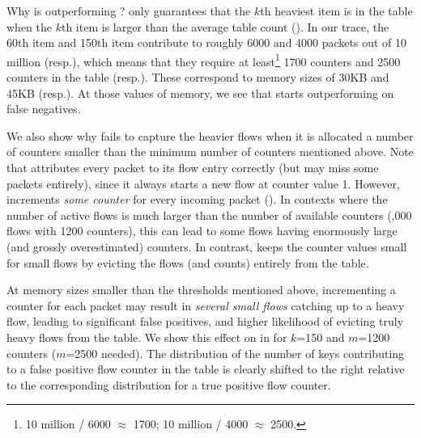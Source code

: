 Why is \TheSystem outperforming \spacesaving? \spacesaving only guarantees that
the $k$th heaviest item is in the table when the $k$th item is larger than the
average table count (). In our trace, the 60th item and
150th item contribute to roughly 6000 and 4000 packets out of 10 million
(resp.), which means that they require at least\footnote{10 million / 6000
  $\approx$ 1700; 10 million / 4000 $\approx$ 2500.} 1700 counters and 2500
counters in the table (resp.). These correspond to memory sizes of 30KB and 45KB
(resp.). At those values of memory, we see that \spacesaving starts
outperforming \TheSystem on false negatives.

We also show why \spacesaving fails to capture the heavier flows when it is
allocated a number of counters smaller than the minimum number of counters
mentioned above. Note that \TheSystem attributes every packet to its flow entry
correctly (but may miss some packets entirely), since it always starts a new
flow at counter value 1. However, \spacesaving increments {\em some counter} for
every incoming packet (). In contexts where the number of
active flows is much larger than the number of available counters (,000
flows with 1200 counters), this can lead to some flows having enormously large
(and grossly overestimated) counters. In contrast, \TheSystem keeps the counter
values small for small flows by evicting the flows (and counts) entirely from
the table.

At memory sizes smaller than the thresholds mentioned above, incrementing a
counter for each packet may result in {\em several small flows} catching up to a
heavy flow, leading to significant false positives, and higher likelihood of
evicting truly heavy flows from the table. We show this effect on \spacesaving
in  for $k$=150 and $m$=1200 counters ($m$=2500 needed).
The distribution of the number of keys contributing to a false positive flow
counter in the table is clearly shifted to the right relative to the
corresponding distribution for a true positive flow counter.
%


